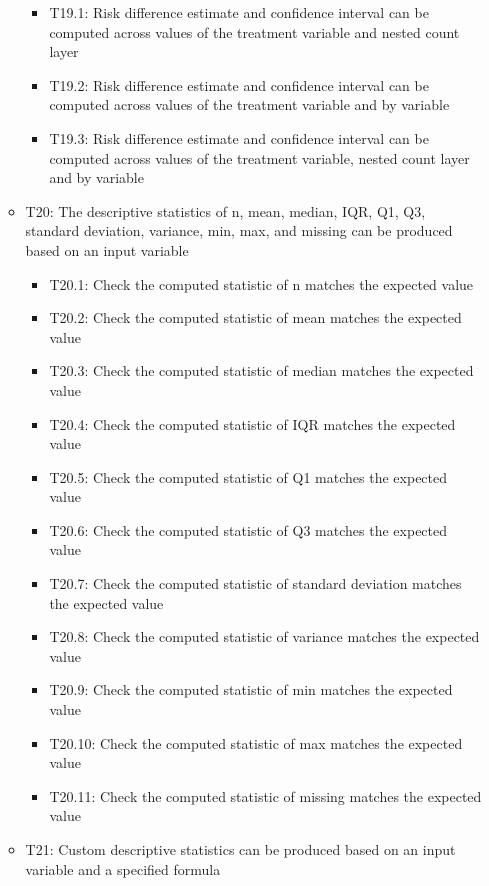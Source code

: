 \documentclass[
]{article}
\providecommand{\tightlist}{%
  \setlength{\itemsep}{0pt}\setlength{\parskip}{0pt}}
\begin{document}
\begin{itemize}
\begin{itemize}
    \begin{itemize}
    \tightlist
    \item
      T19.1: Risk difference estimate and confidence interval can be
      computed across values of the treatment variable and nested count
      layer
    \item
      T19.2: Risk difference estimate and confidence interval can be
      computed across values of the treatment variable and by variable
    \item
      T19.3: Risk difference estimate and confidence interval can be
      computed across values of the treatment variable, nested count
      layer and by variable
    \end{itemize}
  \item
    T20: The descriptive statistics of n, mean, median, IQR, Q1, Q3,
    standard deviation, variance, min, max, and missing can be produced
    based on an input variable

    \begin{itemize}
    \tightlist
    \item
      T20.1: Check the computed statistic of n matches the expected
      value
    \item
      T20.2: Check the computed statistic of mean matches the expected
      value
    \item
      T20.3: Check the computed statistic of median matches the expected
      value
    \item
      T20.4: Check the computed statistic of IQR matches the expected
      value
    \item
      T20.5: Check the computed statistic of Q1 matches the expected
      value
    \item
      T20.6: Check the computed statistic of Q3 matches the expected
      value
    \item
      T20.7: Check the computed statistic of standard deviation matches
      the expected value
    \item
      T20.8: Check the computed statistic of variance matches the
      expected value
    \item
      T20.9: Check the computed statistic of min matches the expected
      value
    \item
      T20.10: Check the computed statistic of max matches the expected
      value
    \item
      T20.11: Check the computed statistic of missing matches the
      expected value
    \end{itemize}
  \item
    T21: Custom descriptive statistics can be produced based on an input
    variable and a specified formula


\end{itemize}
\end{itemize}
\end{document}
